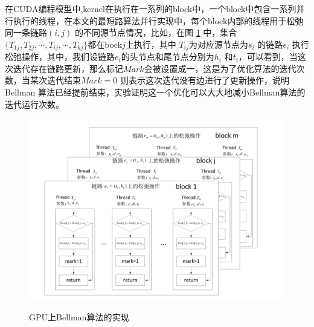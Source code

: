 在CUDA编程模型中,kernel在执行在一系列的block中，一个block中包含一系列并行执行的线程，在本文的最短路算法并行实现中，每个block内部的线程用于松弛同一条链路$(i,j)$ 的不同源节点情况，比如，在图 \ref{GB} 中，集合$\{T_{1j}, T_{2j}, \cdots, T_{ij}, \cdots, T_{kj}\}$都在bock$j$上执行，其中 $T_{ij}$为对应源节点为$s_i$ 的链路$e_i$ 执行松弛操作，其中，我们设链路$e_i$的头节点和尾节点分别为$h_i$ 和$t_i$，可以看到，当这次迭代存在链路更新，那么标记$Mark$会被设置成一，这是为了优化算法的迭代次数，当某次迭代结束$Mark=0$ 则表示这次迭代没有边进行了更新操作，说明Bellman 算法已经提前结束，实验证明这一个优化可以大大地减小Bellman算法的迭代运行次数。
\begin{figure}
\setlength{\belowcaptionskip}{-0.5cm}
  \begin{center}
    {\includegraphics[width=1 \textwidth]{figures/GPUimpl.pdf}}
    \end{center}
  \caption{{\footnotesize{GPU上Bellman算法的实现}}}
  \label{GB}
\end{figure}

